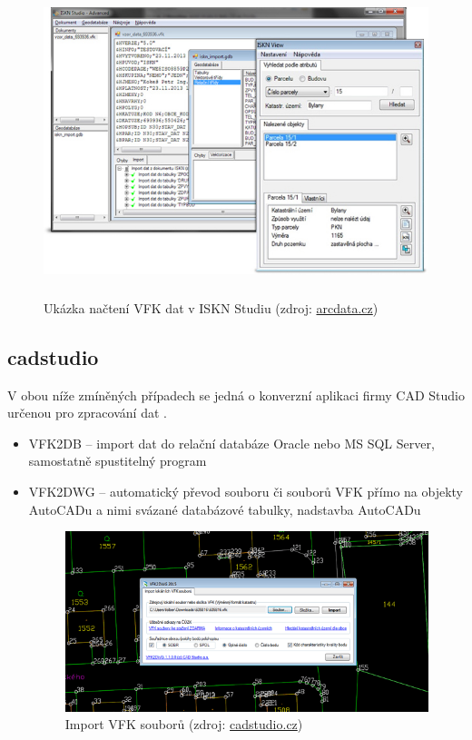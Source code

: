 \begin{figure}[H]
	 \centering
      \includegraphics[height=9cm]{./pictures/iskn_studio.jpeg}
      \caption{Ukázka načtení VFK dat v ISKN Studiu (zdroj:
\href{https://www.arcdata.cz/uploads/media/general/0001/01/68f0bfd90cf19d903a57fc8457e1f228a7dd47f4.jpeg}{arcdata.cz})}
      \label{fig:ISKNStudio}
  \end{figure}
\subsection{cadstudio}
V obou níže zmíněných případech se jedná o konverzní aplikaci firmy CAD Studio
určenou pro zpracování dat .
\begin{itemize}[leftmargin=50pt]
\item VFK2DB -- import dat do relační databáze Oracle nebo MS SQL Server, samostatně spustitelný program \cite{vfk2db} %
\item VFK2DWG -- automatický převod souboru či souborů VFK přímo na objekty AutoCADu a nimi svázané databázové tabulky, nadstavba AutoCADu \cite{vfk2dwg}

\begin{figure}[H]
	 \centering
      \includegraphics[width=14cm]{./pictures/vfk2dwg.png}
      \caption{Import VFK souborů (zdroj:
\href{http://www.cadstudio.cz/img/vfk2dwg11.gif}{cadstudio.cz})}
      \label{fig:cadstudio}
  \end{figure}
\end{itemize}
